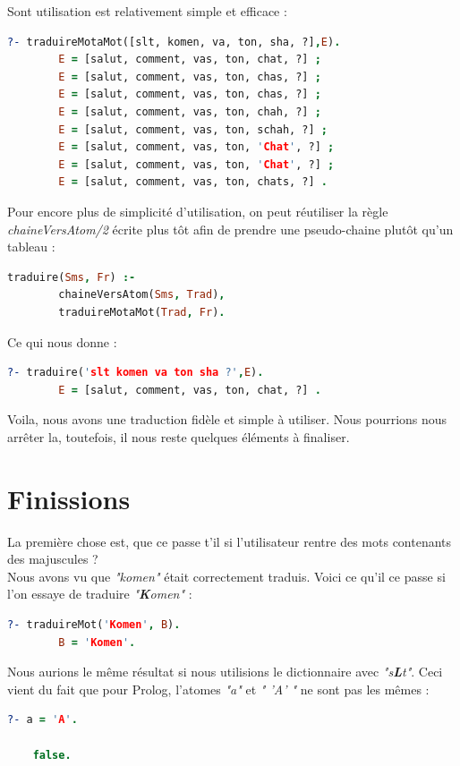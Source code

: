 \documentclass[11pt]{book}
\begin{document}
	Sont utilisation est relativement simple et efficace :
	\begin{lstlisting}[language=Prolog]
	?- traduireMotaMot([slt, komen, va, ton, sha, ?],E).
		E = [salut, comment, vas, ton, chat, ?] ;
		E = [salut, comment, vas, ton, chas, ?] ;
		E = [salut, comment, vas, ton, chas, ?] ;
		E = [salut, comment, vas, ton, chah, ?] ;
		E = [salut, comment, vas, ton, schah, ?] ;
		E = [salut, comment, vas, ton, 'Chat', ?] ;
		E = [salut, comment, vas, ton, 'Chat', ?] ;
		E = [salut, comment, vas, ton, chats, ?] .
	\end{lstlisting}
	
	Pour encore plus de simplicité d'utilisation, on peut réutiliser la règle {\em chaineVersAtom/2} écrite plus tôt afin de prendre une pseudo-chaine plutôt qu'un tableau :
	\begin{lstlisting}[language=Prolog]
	traduire(Sms, Fr) :-
		chaineVersAtom(Sms, Trad),
		traduireMotaMot(Trad, Fr).
	\end{lstlisting}
	
	Ce qui nous donne :
	\begin{lstlisting}[language=Prolog]
	?- traduire('slt komen va ton sha ?',E).
		E = [salut, comment, vas, ton, chat, ?] .
	\end{lstlisting}
	
	Voila, nous avons une traduction fidèle et simple à utiliser. Nous pourrions nous arrêter la, toutefois, il nous reste quelques éléments à finaliser. 
	
	\section{Finissions}
	La première chose est, que ce passe t'il si l'utilisateur rentre des mots contenants des majuscules ?\\
	Nous avons vu que {\em "komen"} était correctement traduis. Voici ce qu'il ce passe si l'on essaye de traduire {\em "\textbf{K}omen"} :
	\begin{lstlisting}[language=Prolog]
	?- traduireMot('Komen', B).
		B = 'Komen'.
	\end{lstlisting}
	
	Nous aurions le même résultat si nous utilisions le dictionnaire avec {\em "s\textbf{L}t"}. Ceci vient du fait que pour Prolog, l'atomes {\em "a"} et {\em " 'A' "} ne sont pas les mêmes :
	\begin{lstlisting}[language=Prolog]
	?- a = 'A'.
	
	false.
	\end{lstlisting}
	
\end{document}

